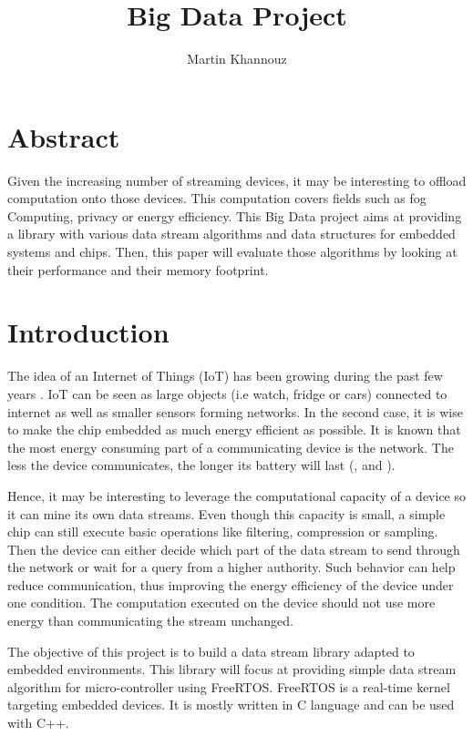 \documentclass{article}
\title{Big Data Project}
\author{Martin Khannouz}
\begin{document}
\maketitle

\section*{Abstract}
Given the increasing number of streaming devices, it may be interesting to offload 
computation onto those devices. This computation covers fields such as fog Computing, privacy or energy efficiency.
This Big Data project aims at providing 
a library with various data stream algorithms and data structures for embedded systems and chips. 
Then, this paper will evaluate those algorithms by looking at their 
performance and their memory footprint.

\section{Introduction}
\label{sec:introduction}
The idea of an Internet of Things (IoT) has been growing during the past few
years \cite{IoT-platform}.  IoT can be seen as large objects (i.e watch, fridge
or cars) connected to internet as well as smaller sensors forming networks.  In
the second case, it is wise to make the chip embedded as much energy efficient
as possible. It is known that the most energy consuming part of a communicating
device is the network. The less the device communicates, the longer its battery
will last (\cite{sensor-network-survey}, \cite{sensor-energy-model} and
\cite{sensor-energy-consumption}).

Hence, it may be interesting to leverage the computational capacity of a device
so it can mine its own data streams. Even though this capacity is small, a
simple chip can still execute basic operations like filtering, compression or
sampling.  Then the device can either decide which part of the data stream to
send through the network or wait for a query from a higher authority. Such
behavior can help reduce communication, thus improving the energy efficiency
of the device under one condition. The computation executed on the device should
not use more energy than communicating the stream unchanged.

The objective of this project is to build a data stream library adapted to
embedded environments. This library will focus at providing simple data stream
algorithm for micro-controller using FreeRTOS. FreeRTOS is a real-time kernel
targeting embedded devices.  It is mostly written in C language and can be used
with C++.
\end{document}
